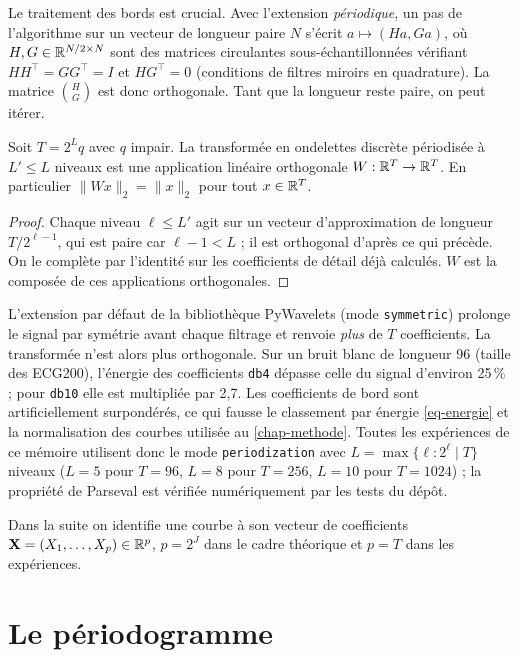 Le traitement des bords est crucial. Avec l'extension \emph{périodique}, un pas de l'algorithme sur un vecteur de longueur paire $N$ s'écrit $a\mapsto(Ha,Ga)$, où $H,G\in\mathbb{R}^{N/2\times N}$ sont des matrices circulantes sous-échantillonnées vérifiant $HH^\top=GG^\top=I$ et $HG^\top=0$ (conditions de filtres miroirs en quadrature). La matrice $\binom{H}{G}$ est donc orthogonale. Tant que la longueur reste paire, on peut itérer.

\begin{proposition}\label{prop-dwt-orthogonale}
Soit $T=2^{L}q$ avec $q$ impair. La transformée en ondelettes discrète périodisée à $L'\le L$ niveaux est une application linéaire orthogonale $W:\mathbb{R}^T\to\mathbb{R}^T$. En particulier $\|Wx\|_2=\|x\|_2$ pour tout $x\in\mathbb{R}^T$.
\end{proposition}

\begin{proof}
Chaque niveau $\ell\le L'$ agit sur un vecteur d'approximation de longueur $T/2^{\ell-1}$, qui est paire car $\ell-1<L$ ; il est orthogonal d'après ce qui précède. On le complète par l'identité sur les coefficients de détail déjà calculés. $W$ est la composée de ces applications orthogonales.
\end{proof}

\begin{remarque}\label{rem-mode-symmetric}
L'extension par défaut de la bibliothèque PyWavelets (mode \texttt{symmetric}) prolonge le signal par symétrie avant chaque filtrage et renvoie \emph{plus} de $T$ coefficients. La transformée n'est alors plus orthogonale. Sur un bruit blanc de longueur 96 (taille des ECG200), l'énergie des coefficients \texttt{db4} dépasse celle du signal d'environ 25\,\% ; pour \texttt{db10} elle est multipliée par 2,7. Les coefficients de bord sont artificiellement surpondérés, ce qui fausse le classement par énergie \eqref{eq-energie} et la normalisation des courbes utilisée au \cref{chap-methode}. Toutes les expériences de ce mémoire utilisent donc le mode \texttt{periodization} avec $L=\max\{\ell:2^\ell\mid T\}$ niveaux ($L=5$ pour $T=96$, $L=8$ pour $T=256$, $L=10$ pour $T=1024$) ; la propriété de Parseval est vérifiée numériquement par les tests du dépôt.
\end{remarque}

Dans la suite on identifie une courbe à son vecteur de coefficients $\mathbf{X}=(X_1,\dots,X_p)\in\mathbb{R}^p$, $p=2^J$ dans le cadre théorique et $p=T$ dans les expériences.

\section{Le périodogramme}\label{sec-periodogramme}

